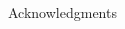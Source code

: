 \documentclass[final]{beamer}
\begin{document}
\begin{frame}{}
\begin{columns}[t]
\begin{column}{.255\linewidth}
\begin{block}{Acknowledgments}
  		\vspace{.5cm}
		\end{block}
		

	\end{column}
\begin{column}{.005\linewidth}
\end{column}  
  
  
\end{columns}

\end{frame}
\end{document}
